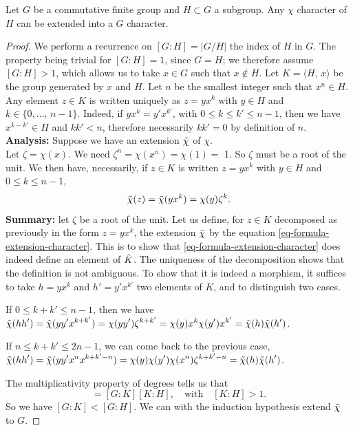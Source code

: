 \begin{lem}
\label{lem-prolongation-caractere}
  Let $G$ be a commutative finite group and $ H \subset G$ a subgroup. Any $\chi$ character of $H$ can be extended into a $G$ character.
\end{lem}
\begin{proof}
\label{notation-15} We perform a recurrence on $[G:H] = | G/H |$ the index of $H$ in $G$. The property being trivial for $[G:H] = 1$, since $ G = H $; we therefore assume $[G:H]> 1$, which allows us to take $ x \in G$ such that $ x \notin H $. Let $ K = \langle H, \, x \rangle $ be the group generated by $ x $ and $H$. Let $n$ be the smallest integer such that $ x^n \in H $. Any element $ z \in K $ is written uniquely as $ z = yx^k $ with $ y \in H $ and $ k \in \{0, \ldots, \, n-1\}$. Indeed, if $ yx^k = y'x^{k'}$, with $0 \leq k \leq k'\leq n-1$, then we have $ x^{k-k'} \in H $ and $ kk'<n $, therefore necessarily $ kk' = 0 $ by definition of $n$. \\\textbf{Analysis:} Suppose we have an extension $\tilde{\chi}$ of $\chi$. \\Let $\zeta = \chi(x)$. We need $\zeta^n = \chi(x^n) = \chi(1) = $ 1. So $\zeta$ must be a  root of the unit. We then have, necessarily, if $ z \in K $ is written $ z = y x^k $ with $ y \in H $ and $0 \le k \le n-1$,
\begin{equation}
\label{eq-formula-extension-character}
\tilde{\chi} (z) = \tilde{\chi} (y x^k) = \chi(y) \zeta^k.
\end{equation}
\textbf{Summary:} let $\zeta$ be a  root of the unit. Let us define, for $ z \in K $ decomposed as previously in the form $ z = y x^k $, the extension $\tilde{\chi}$ by the equation \eqref{eq-formula-extension-character}. This is to show that \eqref{eq-formula-extension-character} does indeed define an element of $\hat{K}$. The uniqueness of the decomposition shows that the definition is not ambiguous. To show that it is indeed a morphism, it suffices to take $ h = yx^k $ and $ h'= y' x^{k'}$ two elements of $ K $, and to distinguish two cases. \begin{rs}
\item If $0 \leq k + k'\leq n-1$, then we have \\$\displaystyle{\tilde{\chi} (h h') = \tilde{\chi} (yy'x^{k + k'}) = \chi(y y') \zeta^{k + k'} = \chi(y) x^k \chi(y') x^{k'} = \tilde{\chi}(h) \tilde{\chi} (h')}$.
\item If $n \leq k + k'\leq 2n-1$, we can come back to the previous case, \\$\displaystyle{\tilde{\chi} (h h') = \tilde{\chi} (yy'x^nx^{k + k' - n}) = \chi(y) \chi(y') \chi(x^n) \zeta^{k + k' - n} = \tilde{\chi}(h) \tilde{\chi} (h')}$.
\end{rs} The multiplicativity property of degrees tells us that
\begin{equation*}
	[G:H] = [G:K] [K:H], \quad \text{with} \quad [K:H]> 1.
\end{equation*}
So we have $[G:K] <[G:H]$. We can with the induction hypothesis extend $\tilde{\chi}$ to $G$.
\end{proof}
